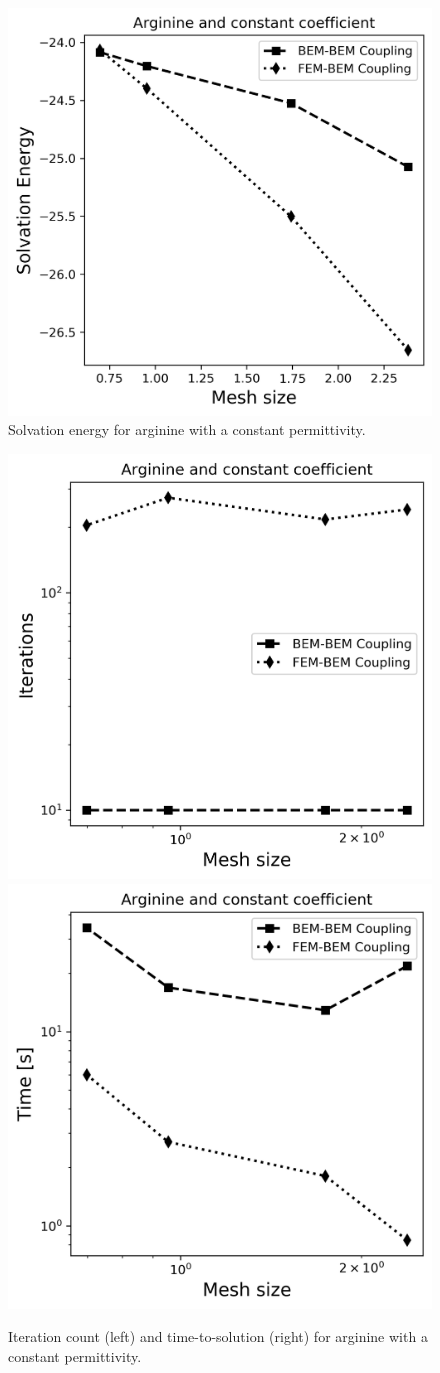 \begin{figure}
\centering
   \includegraphics[width=0.6\linewidth]{Arginine_const_coeff_error_11.png}
\caption{Solvation energy for arginine with a constant permittivity.
}
\label{fig:arg_constant_energy}
\end{figure}

\begin{figure}
\centering
   \includegraphics[width=0.45\linewidth]{Arginine_const_coeff_iter_11.png}
  \includegraphics[width=0.45\linewidth]{Arginine_const_coeff_total_time_11.png}
  \caption{Iteration count (left) and time-to-solution (right) for arginine with a constant permittivity. %
}
\label{fig:arg_constant_time_iter}
\end{figure}


